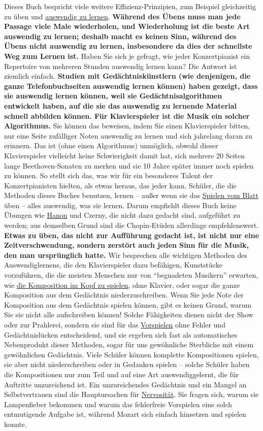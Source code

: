 Dieses Buch bespricht viele weitere Effizienz-Prinzipien, zum Beispiel gleichzeitig zu üben und \hyperref[c1iii6a]{auswendig zu lernen}.
\textbf{Während des Übens muss man jede Passage viele Male wiederholen, und Wiederholung ist die beste Art auswendig zu lernen; deshalb macht es keinen Sinn, während des Übens nicht auswendig zu lernen, insbesondere da dies der schnellste Weg zum Lernen ist.}
Haben Sie sich je gefragt, wie jeder Konzertpianist ein Repertoire von mehreren Stunden auswendig lernen kann?
Die Antwort ist ziemlich einfach.
\textbf{Studien mit Gedächtniskünstlern (wie denjenigen, die ganze Telefonbuchseiten auswendig lernen können) haben gezeigt, dass sie auswendig lernen können, weil sie Gedächtnisalgorithmen entwickelt haben, auf die sie das auswendig zu lernende Material schnell abbilden können.
Für Klavierspieler ist die Musik ein solcher Algorithmus.}
Sie können das beweisen, indem Sie einen Klavierspieler bitten, nur eine Seite zufälliger Noten auswendig zu lernen und sich jahrelang daran zu erinnern.
Das ist (ohne einen Algorithmus) unmöglich, obwohl dieser Klavierspieler vielleicht keine Schwierigkeit damit hat, sich mehrere 20 Seiten lange Beethoven-Sonaten zu merken und sie 10 Jahre später immer noch spielen zu können.
So stellt sich das, was wir für ein besonderes Talent der Konzertpianisten hielten, als etwas heraus, das jeder kann.
Schüler, die die Methoden dieses Buches benutzen, lernen -- außer wenn sie das \hyperref[c1iii11]{Spielen vom Blatt} üben -- alles auswendig, was sie lernen.
Darum empfiehlt dieses Buch keine Übungen wie \hyperref[c1iii7h]{Hanon} und Czerny, die nicht dazu gedacht sind, aufgeführt zu werden; aus demselben Grund sind die Chopin-Etüden allerdings empfehlenswert.
\textbf{Etwas zu üben, das nicht zur Aufführung gedacht ist, ist nicht nur eine Zeitverschwendung, sondern zerstört auch jeden Sinn für die Musik, den man ursprünglich hatte.}
Wir besprechen alle wichtigen Methoden des Auswendiglernens, die den Klavierspieler dazu befähigen, Kunststücke vorzuführen, die die meisten Menschen nur von \enquote{begnadeten Musikern} erwarten, wie 
\hyperref[c1ii12mental]{die Komposition im Kopf zu spielen}, ohne Klavier, oder sogar die ganze Komposition aus dem Gedächtnis niederzuschreiben.
Wenn Sie jede Note der Komposition aus dem Gedächtnis spielen können, gibt es keinen Grund, warum Sie sie nicht alle aufschreiben können!
Solche Fähigkeiten dienen nicht der Show oder zur Prahlerei, sondern sie sind für das \hyperref[c1iii14]{Vorspielen} ohne Fehler und Gedächtnislücken entscheidend, und sie ergeben sich fast als automatisches Nebenprodukt dieser Methoden, sogar für uns gewöhnliche Sterbliche mit einem gewöhnlichen Gedächtnis.
Viele Schüler können komplette Kompositionen spielen, sie aber nicht niederschreiben oder in Gedanken spielen -- solche Schüler haben die Kompositionen nur zum Teil und auf eine Art auswendiggelernt, die für Auftritte unzureichend ist.
Ein unzureichendes Gedächtnis und ein Mangel an Selbstvertrauen sind die Hauptursachen für \hyperref[c1iii15]{Nervosität}.
Sie fragen sich, warum sie Lampenfieber bekommen und warum das fehlerfreie Vorspielen eine solch entmutigende Aufgabe ist, während Mozart sich einfach hinsetzen und spielen konnte.

